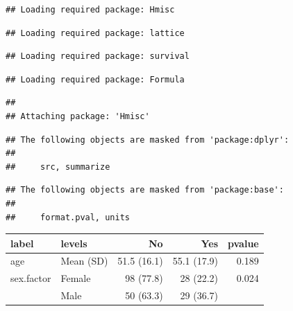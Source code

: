 \documentclass[]{book}
\makeatletter
\newenvironment{Shaded}{\begin{snugshade}}{\end{snugshade}}
\newcommand{\DataTypeTok}[1]{\textcolor[rgb]{0.13,0.29,0.53}{#1}}
\newcommand{\KeywordTok}[1]{\textcolor[rgb]{0.13,0.29,0.53}{\textbf{#1}}}
\newcommand{\NormalTok}[1]{#1}
\newcommand{\OperatorTok}[1]{\textcolor[rgb]{0.81,0.36,0.00}{\textbf{#1}}}
\newcommand{\OtherTok}[1]{\textcolor[rgb]{0.56,0.35,0.01}{#1}}
\newcommand{\StringTok}[1]{\textcolor[rgb]{0.31,0.60,0.02}{#1}}
\newenvironment{kframe}{%
\medskip{}
\setlength{\fboxsep}{.8em}
 \def\at@end@of@kframe{}%
 \ifinner\ifhmode%
  \def\at@end@of@kframe{\end{minipage}}%
  \begin{minipage}{\columnwidth}%
 \fi\fi%
 \def\FrameCommand##1{\hskip\@totalleftmargin \hskip-\fboxsep
 \colorbox{shadecolor}{##1}\hskip-\fboxsep
     \hskip-\linewidth \hskip-\@totalleftmargin \hskip\columnwidth}%
 \MakeFramed {\advance\hsize-\width
   \@totalleftmargin\z@ \linewidth\hsize
   \@setminipage}}%
 {\par\unskip\endMakeFramed%
 \at@end@of@kframe}
\renewenvironment{Shaded}{\begin{kframe}}{\end{kframe}}
\theoremstyle{definition}
\theoremstyle{definition}
\theoremstyle{definition}
\theoremstyle{remark}
\makeatother
\begin{document}
\begin{verbatim}
## Loading required package: Hmisc
\end{verbatim}

\begin{verbatim}
## Loading required package: lattice
\end{verbatim}

\begin{verbatim}
## Loading required package: survival
\end{verbatim}

\begin{verbatim}
## Loading required package: Formula
\end{verbatim}

\begin{verbatim}
## 
## Attaching package: 'Hmisc'
\end{verbatim}

\begin{verbatim}
## The following objects are masked from 'package:dplyr':
## 
##     src, summarize
\end{verbatim}

\begin{verbatim}
## The following objects are masked from 'package:base':
## 
##     format.pval, units
\end{verbatim}

\begin{Shaded}
\end{Shaded}

\begin{tabular}{l|l|r|r|r}
\hline
label & levels & No & Yes & pvalue\\
\hline
age & Mean (SD) & 51.5 (16.1) & 55.1 (17.9) & 0.189\\
\hline
sex.factor & Female & 98 (77.8) & 28 (22.2) & 0.024\\
\hline
 & Male & 50 (63.3) & 29 (36.7) & \\
\hline
\end{tabular}
\end{document}
